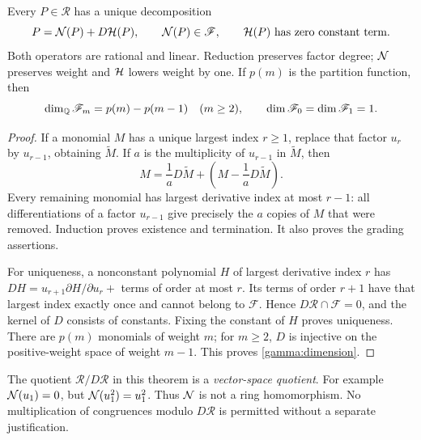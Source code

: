 \begin{theorem}
\label{gamma:normal}
Every $P\in\mathscr R$ has a unique decomposition
\begin{equation}\label{gamma:decomp}
 P=\mathcal N(P)+D\mathcal H(P),\qquad \mathcal N(P)\in\mathscr F,
 \qquad \mathcal H(P)\text{ has zero constant term}.
\end{equation}
Both operators are rational and linear.  Reduction preserves factor
degree; $\mathcal N$ preserves weight and $\mathcal H$ lowers weight by one.
If $p(m)$ is the partition function, then
\begin{equation}\label{gamma:dimension}
 \dim_\mathbb Q\mathscr F_m=p(m)-p(m-1)\quad(m\ge2),
 \qquad \dim\mathscr F_0=\dim\mathscr F_1=1.
\end{equation}
\end{theorem}
\begin{proof}
If a monomial $M$ has a unique largest index $r\ge1$, replace that
factor $u_r$ by $u_{r-1}$, obtaining $\widetilde M$.
If $a$ is the multiplicity of $u_{r-1}$ in $\widetilde M$, then
\[
 M=\frac1aD\widetilde M+
      \left(M-\frac1aD\widetilde M\right).
\]
Every remaining monomial has largest derivative index at most $r-1$:
all differentiations of a factor $u_{r-1}$ give precisely the $a$
copies of $M$ that were removed.  Induction proves existence and
termination.  It also proves the grading assertions.

For uniqueness, a nonconstant polynomial $H$ of largest derivative
index $r$ has
$DH=u_{r+1}\partial H/\partial u_r+$ terms of order at most $r$.
Its terms of order $r+1$ have that largest index exactly once and
cannot belong to $\mathscr F$.  Hence $D\mathscr R\cap\mathscr F=0$,
and the kernel of $D$ consists of constants.  Fixing the constant of
$H$ proves uniqueness.  There are $p(m)$ monomials of weight $m$;
for $m\ge2$, $D$ is injective on the positive-weight space of weight
$m-1$.  This proves \eqref{gamma:dimension}.
\end{proof}

The quotient $\mathscr R/D\mathscr R$ in this theorem is a
\emph{vector-space quotient}.  For example $\mathcal N(u_1)=0$, but
$\mathcal N(u_1^2)=u_1^2$.  Thus $\mathcal N$ is not a ring homomorphism.
No multiplication of congruences modulo $D\mathscr R$ is permitted
without a separate justification.

